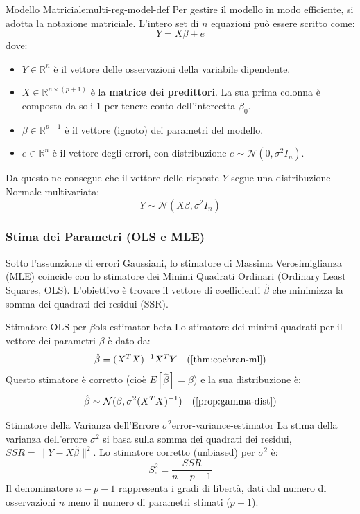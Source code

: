 \begin{definizione}{Modello Matriciale}{multi-reg-model-def}
Per gestire il modello in modo efficiente, si adotta la notazione matriciale. L'intero set di \(n\) equazioni può essere scritto come:
\[
    Y = X\beta + e
\]
dove:
\begin{itemize}
    \item \(Y \in \mathbb{R}^n\) è il vettore delle osservazioni della variabile dipendente.
    \item \(X \in \mathbb{R}^{n \times (p+1)}\) è la \textbf{matrice dei predittori}. La sua prima colonna è composta da soli 1 per tenere conto dell'intercetta \(\beta_0\).
    \item \(\beta \in \mathbb{R}^{p+1}\) è il vettore (ignoto) dei parametri del modello.
    \item \(e \in \mathbb{R}^n\) è il vettore degli errori, con distribuzione \(e \sim \mathcal{N}(0, \sigma^2 I_n)\).
\end{itemize}
Da questo ne consegue che il vettore delle risposte \(Y\) segue una distribuzione Normale multivariata:
\[
    Y \sim \mathcal{N}(X\beta, \sigma^2 I_n)
\]
\end{definizione}

\subsubsection{Stima dei Parametri (OLS e MLE)}
Sotto l'assunzione di errori Gaussiani, lo stimatore di Massima Verosimiglianza (MLE) coincide con lo stimatore dei Minimi Quadrati Ordinari (Ordinary Least Squares, OLS). L'obiettivo è trovare il vettore di coefficienti \(\hat{\beta}\) che minimizza la somma dei quadrati dei residui (SSR).

\begin{proposizione}{Stimatore OLS per \(\beta\)}{ols-estimator-beta}
Lo stimatore dei minimi quadrati per il vettore dei parametri \(\beta\) è dato da:
\begin{align*}
    \hat{\beta} = (X^T X)^{-1} X^T Y && (\text{\Cref{thm:cochran-ml}})
\end{align*}
Questo stimatore è corretto (cioè \(E[\hat{\beta}] = \beta\)) e la sua distribuzione è:
\begin{align*}
    \hat{\beta} \sim \mathcal{N}(\beta, \sigma^2(X^T X)^{-1}) && (\text{\Cref{prop:gamma-dist}})
\end{align*}
\end{proposizione}

\begin{definizione}{Stimatore della Varianza dell'Errore \(\sigma^2\)}{error-variance-estimator}
La stima della varianza dell'errore \(\sigma^2\) si basa sulla somma dei quadrati dei residui, \(SSR = \|Y - X\hat{\beta}\|^2\). Lo stimatore corretto (unbiased) per \(\sigma^2\) è:
\[
    S_e^2 = \frac{SSR}{n-p-1}
\]
Il denominatore \(n-p-1\) rappresenta i gradi di libertà, dati dal numero di osservazioni \(n\) meno il numero di parametri stimati (\(p+1\)).
\end{definizione}

